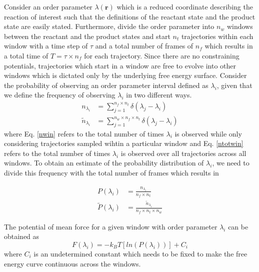 \documentclass{article}
\begin{document}
Consider an order parameter $\lambda(\mathbf{r})$ which is a reduced coordinate describing
the reaction of interest such that the definitions of the reactant state and the product 
state are easily stated. 
Furthermore, divide the order parameter into $n_w$ windows between the reactant and the product states and start $n_t$ trajectories within each window with a time step
of $\tau$ and a total number of frames of $n_{f}$ which results in a total time of $T = \tau\times n_f$ for each trajectory. Since there are no constraining potentials, trajectories which start in a window are free to evolve into other windows which is dictated only by the underlying free energy surface. Consider the probability of observing an order parameter interval defined as $\lambda_i$, given that we define the frequency of observing $\lambda_i$
in two different ways. 
\begin{align}
n_{\lambda_i} &= \sum_{j=1}^{n_f\times n_t} \delta(\lambda_j - \lambda_i) \label{nwin}\\
\tilde{n}_{\lambda_i} &= \sum_{j=1}^{n_w\times n_f\times n_t} \delta(\lambda_j - \lambda_i) \label{ntotwin}
\end{align}
where Eq. \ref{nwin} refers to the total number of times $\lambda_i$ is observed while 
only considering trajectories sampled wihtin a particular window and Eq. \ref{ntotwin}
refers to the total number of times $\lambda_i$ is observed over all trajectories across
all windows. To obtain an estimate of the probability distribution of $\lambda_i$, we need to divide this frequency with the total number of frames which results in

\begin{align}
P(\lambda_i) &= \frac{n_{\lambda_i}}{n_f\times n_t} \\
\tilde{P}(\lambda_i) &= \frac{\tilde{n}_{\lambda_i}}{n_f\times n_t\times n_w}
\end{align}

The potential of mean force for a given window with order parameter $\lambda_i$ can be obtained as 
\begin{equation}
F(\lambda_i) = -k_{B}T[ln(P(\lambda_i))] + C_i
\end{equation}
where $C_i$ is an undetermined constant which needs to be fixed to make the free energy curve continuous across the windows.  
\end{document}
